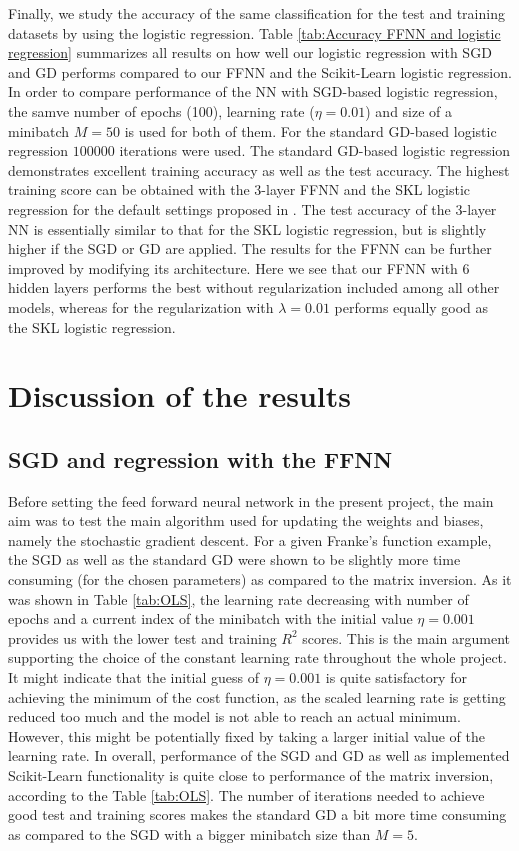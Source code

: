 \documentclass{emulateapj}
\begin{document}
Finally, we study the accuracy of the same classification for the test and training datasets by using the logistic regression. Table \ref{tab:Accuracy FFNN and logistic regression} summarizes all results on how well our logistic regression with SGD and GD performs compared to our FFNN and the Scikit-Learn logistic regression. In order to compare performance of the NN with SGD-based logistic regression, the samve number of epochs (100), learning rate ($\eta=0.01$) and size of a minibatch $M=50$ is used for both of them. For the standard GD-based logistic regression $100000$ iterations were used. The standard GD-based logistic regression demonstrates excellent training accuracy as well as the test accuracy. The highest training score can be obtained with the 3-layer FFNN and the SKL logistic regression for the default settings proposed in \cite{skl}. The test accuracy of the 3-layer NN is essentially similar to that for the SKL logistic regression, but is slightly higher if the SGD or GD are applied. The results for the FFNN can be further improved by modifying its architecture. Here we see that our FFNN with 6 hidden layers performs the best without regularization included among all other models, whereas for the regularization with $\lambda=0.01$ performs equally good as the SKL logistic regression. 

\section{Discussion of the results}  
\label{sec: Discussion}

\subsection{SGD and regression with the FFNN}  
\label{sec: Discussion_1}

Before setting the feed forward neural network in the present project, the main aim was to test the main algorithm used for updating the weights and biases, namely the stochastic gradient descent. For a given Franke's function example, the SGD as well as the standard GD were shown to be slightly more time consuming (for the chosen parameters) as compared to the matrix inversion.  As it was shown in Table \ref{tab:OLS}, the learning rate decreasing with number of epochs and a current index of the minibatch with the initial value $\eta=0.001$ provides us with the lower test and training $R^2$ scores. This is the main argument supporting the choice of the constant learning rate throughout the whole project. It might indicate that the initial guess of $\eta=0.001$ is quite satisfactory for achieving the minimum of the cost function, as the scaled learning rate is getting reduced too much and the model is not able to reach an actual minimum. However, this might be potentially fixed by taking a larger initial value of the learning rate. In overall, performance of the SGD and GD as well as implemented Scikit-Learn functionality is quite close to performance of the matrix inversion, according to the Table \ref{tab:OLS}. The number of iterations needed to achieve good test and training scores makes the standard GD a bit more time consuming as compared to the SGD with a bigger minibatch size than $M=5$.
\end{document}
